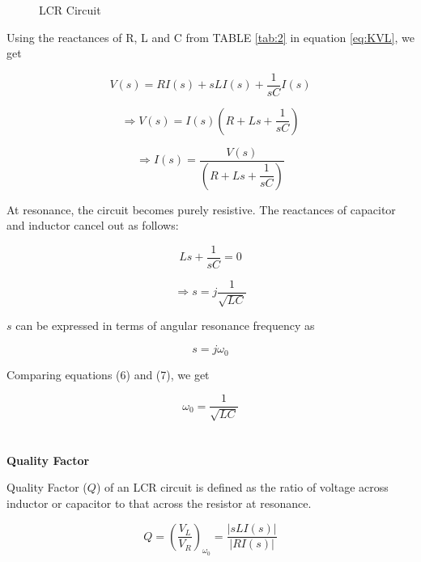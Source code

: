 \documentclass[journal,12pt,twocolumn]{IEEEtran}
\theoremstyle{remark}
\begin{document}
\begin{figure}[h]
 \centering
    
    \caption{LCR Circuit}
    \label{fig:2}
\end{figure}

Using the reactances of R, L and C from TABLE \ref{tab:2} in equation \eqref{eq:KVL}, we get

\begin{equation}
    V(s) = R I(s) + sL I(s) + \dfrac{1}{sC} I(s)
\end{equation}

\begin{equation}
    \Rightarrow V(s) = I(s)\left(R + Ls + \dfrac{1}{sC}\right)
\end{equation}

\begin{equation}
    \Rightarrow I(s) = \dfrac{V(s)}{\left(R + Ls + \dfrac{1}{sC}\right)} \label{eq: 4}
\end{equation}

At resonance, the circuit becomes purely resistive. The reactances of capacitor and inductor cancel out as follows:

\begin{equation}
    Ls + \dfrac{1}{sC} = 0
\end{equation}

\begin{equation}
    \Rightarrow s = j\dfrac{1}{\sqrt{LC}} \label{eq: 6}
\end{equation}

$s$ can be expressed in terms of angular resonance frequency as

\begin{equation}
    s = j\omega_0 \label{eq: 7}
\end{equation}

Comparing equations (6) and (7), we get

\begin{equation}
    \omega_0 = \dfrac{1}{\sqrt{LC}}
\end{equation}\\
\\
\textbf{Quality Factor}

Quality Factor ($Q$) of an LCR circuit is defined as the ratio of voltage across inductor or capacitor to that across the resistor at resonance.

\begin{equation}
    Q = \left(\dfrac{V_L}{V_R}\right)_{\omega_0} = \dfrac{\lvert{sLI(s)}\rvert}{\lvert RI(s) \rvert}
\end{equation}
\end{document}

